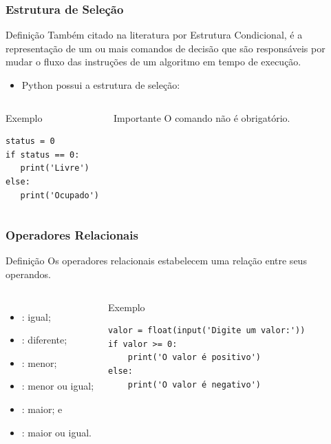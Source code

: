 \documentclass[aspectratio=169]{beamer} %
\begin{document}
\begin{frame}[fragile]
\frametitle{Estrutura de Seleção}

\begin{block}{Definição}
Também citado na literatura por Estrutura Condicional, é a
representação de um ou mais comandos de decisão que são responsáveis por mudar o fluxo das instruções de um algoritmo em tempo de execução.
\end{block} \vfill

\begin{itemize}
	\item Python possui a estrutura de seleção: 
\end{itemize}

 \begin{columns}[c]

\begin{exampleblock}{Exemplo}
	\begin{lstlisting}
status = 0
if status == 0:
   print('Livre')
else:
   print('Ocupado')
\end{lstlisting}
\end{exampleblock}

\begin{alertblock}{Importante}
O comando  não é obrigatório.
\end{alertblock}

\end{columns}
\end{frame}

\begin{frame}[fragile]
\frametitle{Operadores Relacionais}

\begin{block}{Definição}
	Os operadores relacionais estabelecem uma relação entre seus operandos.
\end{block} \vfill

\begin{columns}
	
\begin{itemize}
	\item \structure{==} : igual;
	\item \structure{!=} : diferente;
	\item \structure{<} : menor;
	\item \structure{<=} : menor ou igual;
	\item \structure{>} : maior; e
	\item \structure{>=} : maior ou igual.
\end{itemize}\vfill

\begin{exampleblock}{Exemplo}
	\begin{lstlisting}
valor = float(input('Digite um valor:'))
if valor >= 0:
    print('O valor é positivo')
else:
    print('O valor é negativo')
	\end{lstlisting}
\end{exampleblock}
\end{columns}
\end{frame}
\end{document}
